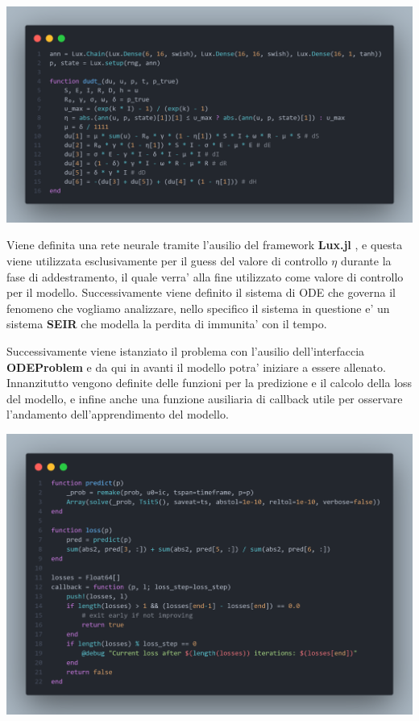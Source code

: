 \begin{minipage}{\linewidth}
	\centering
	\includegraphics[width=\textwidth]{img/controller1.png}
	\label{fig:controller1}
\end{minipage}

Viene definita una rete neurale tramite l'ausilio del framework \textbf{Lux.jl} \cite{pal2023lux}, e questa viene utilizzata
esclusivamente per il guess del valore di controllo $\eta$ durante la fase di addestramento, il quale verra' 
alla fine utilizzato come valore di controllo per il modello. Successivamente viene definito il sistema di ODE che governa il fenomeno che vogliamo analizzare, nello specifico il sistema in 
questione e' un sistema \textbf{SEIR} che modella la perdita di immunita' con il tempo. 

Successivamente viene istanziato il problema con l'ausilio dell'interfaccia \textbf{ODEProblem} e da qui in avanti il modello potra' iniziare a 
essere allenato. Innanzitutto vengono definite delle funzioni per la predizione e il calcolo della loss del modello, 
e infine anche una funzione ausiliaria di callback utile per osservare l'andamento dell'apprendimento del modello.

\begin{minipage}{\linewidth}
	\centering
	\includegraphics[width=\textwidth]{img/controller2.png}
	\label{fig:controller2}
\end{minipage}

